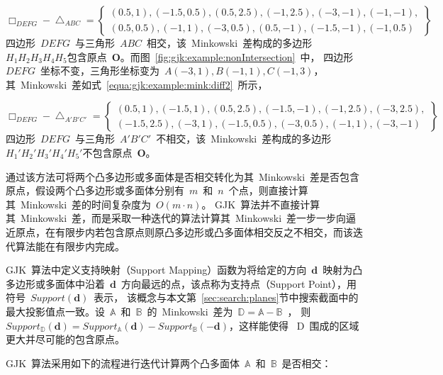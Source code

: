 \begin{equation}
\label{equa:gjk:example:mink:diff}
\Box_{DEFG} - \bigtriangleup_{ABC} = \left\{ 
  \begin{array}{l}
    (0.5, 1),  (-1.5, 0.5),  (0.5, 2.5), (-1, 2.5), (-3, -1), (-1, -1), \\
    (0.5, 0.5), (-1, 1), (-3, 0.5), (0.5, -1), (-1.5, -1), (-1, 0.5)
  \end{array}
    \right\}  
\end{equation}
四边形~$DEFG$~与三角形~$ABC$~相交，该~Minkowski~差构成的多边形~$H_1H_2H_3H_4H_5$包含原点~$\bm{O}$。而图~\ref{fig:gjk:example:nonIntersection}~中，
四边形~$DEFG$~坐标不变，三角形坐标变为~$A(-3, 1), B(-1, 1), C(-1,3)$，其~Minkowski~差如式~\ref{equa:gjk:example:mink:diff2}~所示，

\begin{equation}
\label{equa:gjk:example:mink:diff2}
\Box_{DEFG} - \bigtriangleup_{A'B'C'} = \left\{ 
  \begin{array}{l}
   (0.5, 1), (-1.5, 1),(0.5, 2.5)  , (-1.5, -1), (-1, 2.5),(-3, 2.5), \\ 
   (-1.5, 2.5), (-3, 1), (-1.5, 0.5), (-3, 0.5), (-1, 1),(-3, -1) 
  \end{array}
  \right\}  
\end{equation}
四边形~$DEFG$~与三角形~$A'B'C'$~不相交，该~Minkowski~差构成的多边形~$H_1'H_2'H_3'H_4'H_5'$不包含原点~$\bm{O}$。

通过该方法可将两个凸多边形或多面体是否相交转化为其~Minkowski~差是否包含原点，假设两个凸多边形或多面体分别有~$m$~和~$n$~个点，则直接计算其~Minkowski~差的时间复杂度为~$O(m \cdot n)$。
GJK~算法并不直接计算其~Minkowski~差，而是采取一种迭代的算法计算其~Minkowski~差一步一步向逼近原点，在有限步内若包含原点则原凸多边形或凸多面体相交反之不相交，而该迭代算法能在有限步内完成。

GJK~算法中定义支持映射（Support Mapping）函数为将给定的方向~$\bm{d}$~映射为凸多边形或多面体中沿着~$\bm{d}$~方向最远的点，该点称为支持点（Support Point），用符号~$Support(\bm{d})$~表示，
该概念与本文第~\ref{sec:search:planes}节中搜索截面中的最大投影值点一致。设~$\mathbb{A}$~和~$\mathbb{B}$~的~Minkowski~差为~$\mathbb{D} = \mathbb{A}-\mathbb{B}$~，
则~$Support_\mathbb{D}(\bm{d}) = Support_\mathbb{A}(\bm{d}) - Support_\mathbb{B}(-\bm{d})$，这样能使得
~D~围成的区域更大并尽可能的包含原点。

GJK~算法采用如下的流程进行迭代计算两个凸多面体~$\mathbb{A}$~和~$\mathbb{B}$~是否相交：

